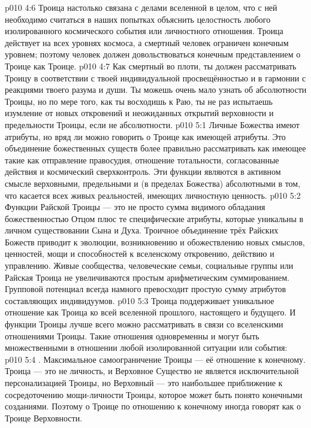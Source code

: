 \vs p010 4:6 \pc Троица настолько связана с делами вселенной в целом, что с ней необходимо считаться в наших попытках объяснить целостность любого изолированного космического события или личностного отношения. Троица действует на всех уровнях космоса, а смертный человек ограничен конечным уровнем; поэтому человек должен довольствоваться конечным представлением о Троице как Троице.
\vs p010 4:7 Как смертный во плоти, ты должен рассматривать Троицу в соответствии с твоей индивидуальной просвещённостью и в гармонии с реакциями твоего разума и души. Ты можешь очень мало узнать об абсолютности Троицы, но по мере того, как ты восходишь к Раю, ты не раз испытаешь изумление от новых откровений и неожиданных открытий верховности и предельности Троицы, если не абсолютности.
\vs p010 5:1 Личные Божества имеют атрибуты, но вряд ли можно говорить о Троице как имеющей атрибуты. Это объединение божественных существ более правильно рассматривать как имеющее  такие как отправление правосудия, отношение тотальности, согласованные действия и космический сверхконтроль. Эти функции являются в активном смысле верховными, предельными и (в пределах Божества) абсолютными в том, что касается всех живых реальностей, имеющих личностную ценность.
\vs p010 5:2 Функции Райской Троицы --- это не просто сумма видимого обладания божественностью Отцом плюс те специфические атрибуты, которые уникальны в личном существовании Сына и Духа. Троичное объединение трёх Райских Божеств приводит к эволюции, возникновению и обожествлению новых смыслов, ценностей, мощи и способностей к вселенскому откровению, действию и управлению. Живые сообщества, человеческие семьи, социальные группы или Райская Троица не увеличиваются простым арифметическим суммированием. Групповой потенциал всегда намного превосходит простую сумму атрибутов составляющих индивидуумов.
\vs p010 5:3 \pc Троица поддерживает уникальное отношение как Троица ко всей вселенной прошлого, настоящего и будущего. И функции Троицы лучше всего можно рассматривать в связи со вселенскими отношениями Троицы. Такие отношения одновременны и могут быть множественными в отношении любой изолированной ситуации или события:
\vs p010 5:4 . Максимальное самоограничение Троицы --- её отношение к конечному. Троица --- это не личность, и Верховное Существо не является исключительной персонализацией Троицы, но Верховный --- это наибольшее приближение к сосредоточению мощи\hyp{}личности Троицы, которое может быть понято конечными созданиями. Поэтому о Троице по отношению к конечному иногда говорят как о Троице Верховности.
